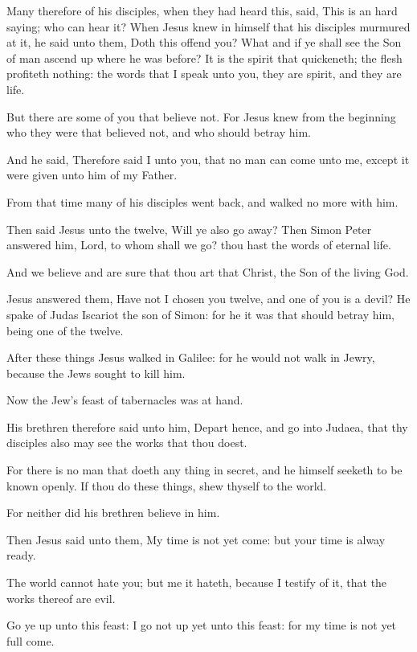 \Verse Many therefore of his disciples, when they had heard this, said, This is an hard saying; who can hear it?  \Verse When Jesus knew in himself that his disciples murmured at it, he said unto them, Doth this offend you?  \Verse What and if ye shall see the Son of man ascend up where he was before?  \Verse It is the spirit that quickeneth; the flesh profiteth nothing: the words that I speak unto you, they are spirit, and they are life.

\Verse But there are some of you that believe not. For Jesus knew from the beginning who they were that believed not, and who should betray him.

\Verse And he said, Therefore said I unto you, that no man can come unto me, except it were given unto him of my Father.

\Verse From that time many of his disciples went back, and walked no more with him.

\Verse Then said Jesus unto the twelve, Will ye also go away?  \Verse Then Simon Peter answered him, Lord, to whom shall we go? thou hast the words of eternal life.

\Verse And we believe and are sure that thou art that Christ, the Son of the living God.

\Verse Jesus answered them, Have not I chosen you twelve, and one of you is a devil?  \Verse He spake of Judas Iscariot the son of Simon: for he it was that should betray him, being one of the twelve.


\Chapter
\Verse After these things Jesus walked in Galilee: for he would not walk in Jewry, because the Jews sought to kill him.

\Verse Now the Jew's feast of tabernacles was at hand.

\Verse His brethren therefore said unto him, Depart hence, and go into Judaea, that thy disciples also may see the works that thou doest.

\Verse For there is no man that doeth any thing in secret, and he himself seeketh to be known openly. If thou do these things, shew thyself to the world.

\Verse For neither did his brethren believe in him.

\Verse Then Jesus said unto them, My time is not yet come: but your time is alway ready.

\Verse The world cannot hate you; but me it hateth, because I testify of it, that the works thereof are evil.

\Verse Go ye up unto this feast: I go not up yet unto this feast: for my time is not yet full come.

